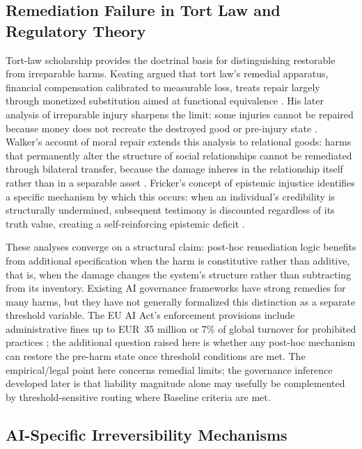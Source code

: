 \documentclass[11pt]{article}
\begin{document}
\subsection{Remediation Failure in Tort Law and Regulatory Theory}

Tort-law scholarship provides the doctrinal basis for distinguishing restorable from irreparable harms. Keating argued that tort law's remedial apparatus, financial compensation calibrated to measurable loss, treats repair largely through monetized substitution aimed at functional equivalence \parencite{keating2010}. His later analysis of irreparable injury sharpens the limit: some injuries cannot be repaired because money does not recreate the destroyed good or pre-injury state \parencite{keating2023}. Walker's account of moral repair extends this analysis to relational goods: harms that permanently alter the structure of social relationships cannot be remediated through bilateral transfer, because the damage inheres in the relationship itself rather than in a separable asset \parencite{walker2006}. Fricker's concept of epistemic injustice identifies a specific mechanism by which this occurs: when an individual's credibility is structurally undermined, subsequent testimony is discounted regardless of its truth value, creating a self-reinforcing epistemic deficit \parencite{fricker2007}.

These analyses converge on a structural claim: post-hoc remediation logic benefits from additional specification when the harm is constitutive rather than additive, that is, when the damage changes the system's structure rather than subtracting from its inventory. Existing AI governance frameworks have strong remedies for many harms, but they have not generally formalized this distinction as a separate threshold variable. The EU AI Act's enforcement provisions include administrative fines up to EUR~35 million or 7\% of global turnover for prohibited practices \parencite{euaiact2024}; the additional question raised here is whether any post-hoc mechanism can restore the pre-harm state once threshold conditions are met. The empirical/legal point here concerns remedial limits; the governance inference developed later is that liability magnitude alone may usefully be complemented by threshold-sensitive routing where Baseline criteria are met.

\subsection{AI-Specific Irreversibility Mechanisms}
\end{document}
